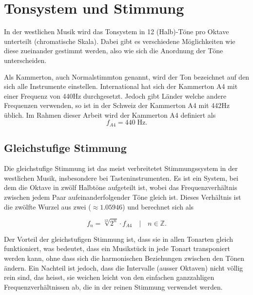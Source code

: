 %
%
%
%
\section{Tonsystem und Stimmung
\label{autotune:section:tonsystemUndStimmung}}
In der westlichen Musik wird das Tonsystem in 12 (Halb)-Töne pro Oktave unterteilt (chromatische Skala).
Dabei gibt es verschiedene Möglichkeiten wie diese zueinander gestimmt werden, also wie sich die Anordnung der Töne unterscheiden.

Als Kammerton, auch Normalstimmton genannt, wird der Ton bezeichnet auf den sich alle Instrumente einstellen.
International hat sich der Kammerton A4 mit einer Frequenz von 440\;Hz durchgesetzt.
Jedoch gibt Länder welche andere Frequenzen verwenden, so ist in der Schweiz der Kammerton A4 mit 442\;Hz üblich.
Im Rahmen dieser Arbeit wird der Kammerton A4 definiert als 
\begin{equation}
    f_{A4}
    =
    440\;\text{Hz}.
\end{equation}

\subsection{Gleichstufige Stimmung
\label{autotune:subsection:gleichstuffigeStimmung}}
Die gleichstufige Stimmung ist das meist verbreitetet Stimmungssystem in der westlichen Musik, insbesondere bei Tasteninstrumenten.
Es ist ein System, bei dem die Oktave in zwölf Halbtöne aufgeteilt ist,
wobei das Frequenzverhältnis zwischen jedem Paar aufeinanderfolgender Töne gleich ist.
Dieses Verhältnis ist die zwölfte Wurzel aus zwei ($\approx 1.05946$) und berechnet sich als

\begin{equation}
    f_n
    =
    \sqrt[12]{2^n} \cdot f_{A4}
    \quad | \quad
    n \in \mathbb{Z}.
\end{equation}

Der Vorteil der gleichstufigen Stimmung ist, dass sie in allen Tonarten gleich funktioniert, was bedeutet,
dass ein Musikstück in jede Tonart transponiert werden kann, ohne dass sich die harmonischen Beziehungen zwischen den Tönen ändern.
Ein Nachteil ist jedoch, dass die Intervalle (ausser Oktaven) nicht völlig rein sind, das heisst,
sie weichen leicht von den einfachen ganzzahligen Frequenzverhältnissen ab, die in der reinen Stimmung verwendet werden.

